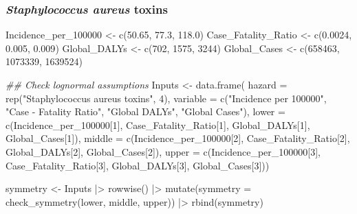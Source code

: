\documentclass[
  letterpaper,
  DIV=11,
  numbers=noendperiod]{scrartcl}
\newenvironment{Shaded}{\begin{snugshade}}{\end{snugshade}}
\newcommand{\AttributeTok}[1]{\textcolor[rgb]{0.40,0.45,0.13}{#1}}
\newcommand{\DecValTok}[1]{\textcolor[rgb]{0.68,0.00,0.00}{#1}}
\newcommand{\DocumentationTok}[1]{\textcolor[rgb]{0.37,0.37,0.37}{\textit{#1}}}
\newcommand{\FloatTok}[1]{\textcolor[rgb]{0.68,0.00,0.00}{#1}}
\newcommand{\FunctionTok}[1]{\textcolor[rgb]{0.28,0.35,0.67}{#1}}
\newcommand{\NormalTok}[1]{\textcolor[rgb]{0.00,0.23,0.31}{#1}}
\newcommand{\OtherTok}[1]{\textcolor[rgb]{0.00,0.23,0.31}{#1}}
\newcommand{\SpecialCharTok}[1]{\textcolor[rgb]{0.37,0.37,0.37}{#1}}
\newcommand{\StringTok}[1]{\textcolor[rgb]{0.13,0.47,0.30}{#1}}
\begin{document}
\subsubsection{\texorpdfstring{\emph{Staphylococcus aureus}
toxins}{Staphylococcus aureus toxins}}\label{staphylococcus-aureus-toxins}

\begin{Shaded}
\begin{Highlighting}[]
\NormalTok{Incidence\_per\_100000 }\OtherTok{\textless{}{-}} \FunctionTok{c}\NormalTok{(}\FloatTok{50.65}\NormalTok{, }\FloatTok{77.3}\NormalTok{, }\FloatTok{118.0}\NormalTok{)}
\NormalTok{Case\_Fatality\_Ratio }\OtherTok{\textless{}{-}} \FunctionTok{c}\NormalTok{(}\FloatTok{0.0024}\NormalTok{, }\FloatTok{0.005}\NormalTok{, }\FloatTok{0.009}\NormalTok{)}
\NormalTok{Global\_DALYs }\OtherTok{\textless{}{-}} \FunctionTok{c}\NormalTok{(}\DecValTok{702}\NormalTok{, }\DecValTok{1575}\NormalTok{, }\DecValTok{3244}\NormalTok{)}
\NormalTok{Global\_Cases }\OtherTok{\textless{}{-}} \FunctionTok{c}\NormalTok{(}\DecValTok{658463}\NormalTok{, }\DecValTok{1073339}\NormalTok{, }\DecValTok{1639524}\NormalTok{)}

\DocumentationTok{\#\# Check lognormal assumptions}
\NormalTok{Inputs }\OtherTok{\textless{}{-}} \FunctionTok{data.frame}\NormalTok{(}
 \AttributeTok{hazard =} \FunctionTok{rep}\NormalTok{(}\StringTok{"Staphylococcus aureus toxins"}\NormalTok{,  }\DecValTok{4}\NormalTok{), }
 \AttributeTok{variable =} \FunctionTok{c}\NormalTok{(}\StringTok{"Incidence per 100000"}\NormalTok{,  }\StringTok{"Case {-} Fatality Ratio"}\NormalTok{,  }\StringTok{"Global DALYs"}\NormalTok{,  }\StringTok{"Global Cases"}\NormalTok{), }
 \AttributeTok{lower =} \FunctionTok{c}\NormalTok{(Incidence\_per\_100000[}\DecValTok{1}\NormalTok{],  Case\_Fatality\_Ratio[}\DecValTok{1}\NormalTok{],  Global\_DALYs[}\DecValTok{1}\NormalTok{],  Global\_Cases[}\DecValTok{1}\NormalTok{]), }
 \AttributeTok{middle =} \FunctionTok{c}\NormalTok{(Incidence\_per\_100000[}\DecValTok{2}\NormalTok{],  Case\_Fatality\_Ratio[}\DecValTok{2}\NormalTok{],  Global\_DALYs[}\DecValTok{2}\NormalTok{],  Global\_Cases[}\DecValTok{2}\NormalTok{]), }
 \AttributeTok{upper =} \FunctionTok{c}\NormalTok{(Incidence\_per\_100000[}\DecValTok{3}\NormalTok{],  Case\_Fatality\_Ratio[}\DecValTok{3}\NormalTok{],  Global\_DALYs[}\DecValTok{3}\NormalTok{],  Global\_Cases[}\DecValTok{3}\NormalTok{]))}

\NormalTok{symmetry }\OtherTok{\textless{}{-}}\NormalTok{ Inputs }\SpecialCharTok{|\textgreater{}}
 \FunctionTok{rowwise}\NormalTok{() }\SpecialCharTok{|\textgreater{}}
 \FunctionTok{mutate}\NormalTok{(}\AttributeTok{symmetry =} \FunctionTok{check\_symmetry}\NormalTok{(lower,  middle,  upper)) }\SpecialCharTok{|\textgreater{}}
 \FunctionTok{rbind}\NormalTok{(symmetry)}



\end{Highlighting}
\end{Shaded}
\end{document}
